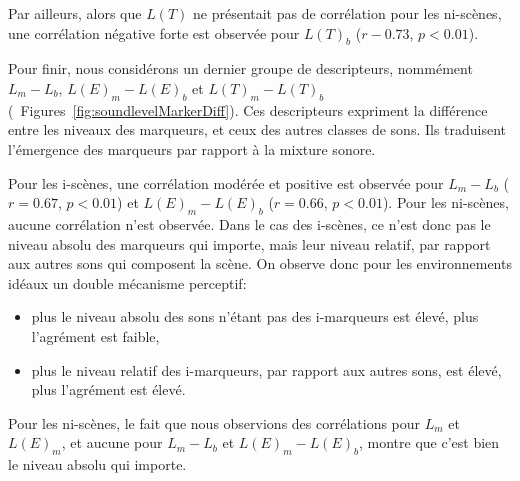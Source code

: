 Par ailleurs, alors que $L(T)$ ne présentait pas de corrélation pour les ni-scènes, une corrélation négative forte est observée pour $L(T)_b$ ($r-0.73$, $p<0.01$). 

Pour finir, nous considérons un dernier groupe de descripteurs, nommément $L_m-L_b$, $L(E)_m-L(E)_b$ et $L(T)_m-L(T)_b$ (\cf~Figures~\ref{fig:soundlevelMarkerDiff}). Ces descripteurs expriment la différence entre les niveaux des marqueurs, et ceux des autres classes de sons. Ils traduisent l'émergence des marqueurs par rapport à la mixture sonore.

Pour les i-scènes, une corrélation modérée et positive est observée pour $L_m-L_b$ ($r=0.67$, $p<0.01$) et $L(E)_m-L(E)_b$ ($r=0.66$, $p<0.01$). Pour les ni-scènes, aucune corrélation n'est observée. Dans le cas des i-scènes, ce n'est donc pas le niveau absolu des marqueurs qui importe, mais leur niveau relatif, par rapport aux autres sons qui composent la scène. On observe donc pour les environnements idéaux un double mécanisme perceptif: 

\begin{itemize}
\item plus le niveau absolu des sons n'étant pas des i-marqueurs est élevé, plus l'agrément est faible,
\item plus le niveau relatif des i-marqueurs, par rapport aux autres sons, est élevé, plus l'agrément est élevé.
\end{itemize}

Pour les ni-scènes, le fait que nous observions des corrélations pour $L_m$ et $L(E)_m$, et aucune pour $L_m-L_b$ et $L(E)_m-L(E)_b$, montre que c'est bien le niveau absolu qui importe.

